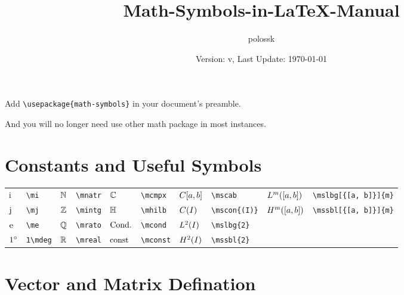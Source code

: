 \documentclass{article}
\title{Math-Symbols-in-\LaTeX{}-Manual}
\author{polossk}
\date{Version: v\artversion, Last Update: \today}
\begin{document}
\maketitle

Add \lstinline`\usepackage{math-symbols}` in your document's preamble.

And you will no longer need use other math package in most instances.

\thispagestyle{fancy}
\renewcommand{\baselinestretch}{1.25}


\section{Constants and Useful Symbols}
\begin{tabular}{*{10}{l}}
    $\mi$    & \lstinline`\mi`  & $\mnatr$ & \lstinline`\mnatr`  & $\mcmpx$  & \lstinline`\mcmpx`  & $\mscab$      & \lstinline`\mscab`  & $\mslbg[{[a, b]}]{m}$ & \lstinline`\mslbg[{[a, b]}]{m}`  \\
    $\mj$    & \lstinline`\mj`  & $\mintg$ & \lstinline`\mintg`  & $\mhilb$  & \lstinline`\mhilb`  & $\mscon{(I)}$ & \lstinline`\mscon{(I)}` & $\mssbl[{[a, b]}]{m}$ & \lstinline`\mssbl[{[a, b]}]{m}` \\
    $\me$    & \lstinline`\me` & $\mrato$ & \lstinline`\mrato` & $\mcond$  & \lstinline`\mcond` & $\mslbg{2}$   & \lstinline`\mslbg{2}` &                                                 \\
    $1\mdeg$ & \lstinline`1\mdeg` & $\mreal$ & \lstinline`\mreal` & $\mconst$ & \lstinline`\mconst` & $\mssbl{2}$   & \lstinline`\mssbl{2}` &                                                 \\
\end{tabular}


\section{Vector and Matrix Defination}
\end{document}
